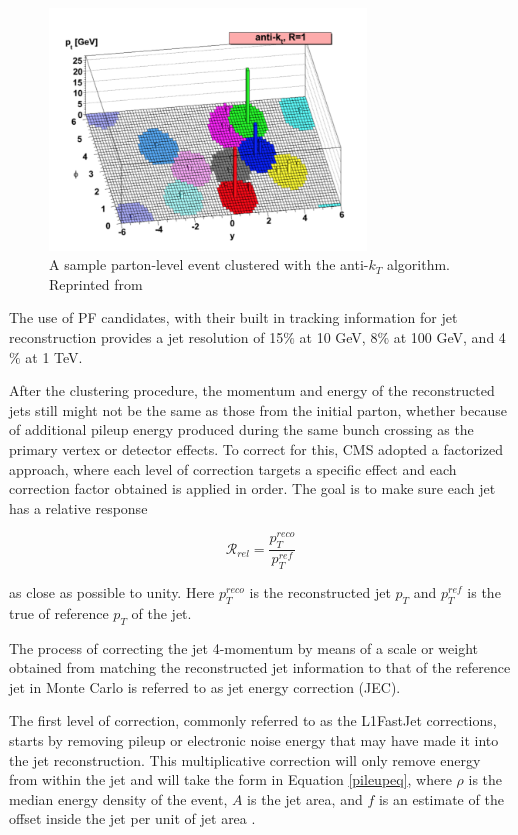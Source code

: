 \begin{figure}[h]
  	\label{fig:antikt}
 	\centering
 	\includegraphics[width=0.75\textwidth]{figures/antikt.png}
 	\singlespace
 	\caption{A sample parton-level event clustered with the anti-$k_{T}$ algorithm. Reprinted from \cite{Cacciari:2008gp}}
 \end{figure}

The use of PF candidates, with their built in tracking information for jet reconstruction provides a jet resolution of 15$\%$ at 10 GeV, 8$\%$ at 100 GeV, and 4$\%$ at 1 TeV\cite{CMS-PAS-PFT-09-001}. 

After the clustering procedure, the momentum and energy of the reconstructed jets still might not be the same as those from the initial parton, whether because of additional pileup energy produced during the same bunch crossing as the primary vertex or detector effects. To correct for this, CMS adopted a factorized approach, where each level of correction targets a specific effect and each correction factor obtained is applied in order. The goal is to make sure each jet has a relative response

\begin{equation}
\mathcal{R}_{rel} = \frac{p_{T}^{reco}}{p_{T}^{ref}} 
\end{equation}

as close as possible to unity. Here $p_{T}^{reco}$ is the reconstructed jet $p_{T}$ and $p_{T}^{ref}$ is the true of reference $p_{T}$ of the jet. 

The process of correcting the jet 4-momentum by means of a scale or weight obtained from matching the reconstructed jet information to that of the reference jet in Monte Carlo is referred to as jet energy correction (JEC).

The first level of correction, commonly referred to as the L1FastJet corrections, starts by removing pileup or electronic noise energy that may have made it into the jet reconstruction. This multiplicative correction will only remove energy from within the jet and will take the form in Equation \ref{pileupeq}, where $\rho$ is the median energy density of the event, $A$ is the jet area, and $f$ is an estimate of the offset inside the jet per unit of jet area \cite{JINST2011,Cacciari2007}.

